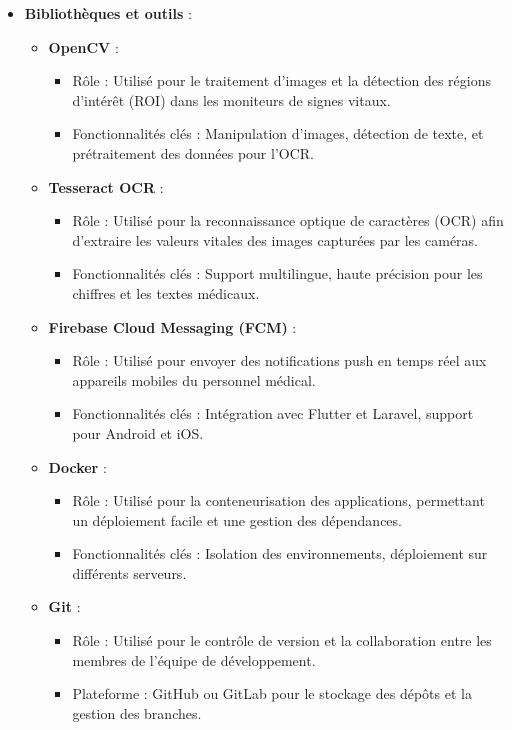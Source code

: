\begin{itemize}
    \item \textbf{Bibliothèques et outils} :
    \begin{itemize}
        \item \textbf{OpenCV} :
            \begin{itemize}
                \item Rôle : Utilisé pour le traitement d'images et la détection des régions d'intérêt (ROI) dans les moniteurs de signes vitaux.
                \item Fonctionnalités clés : Manipulation d'images, détection de texte, et prétraitement des données pour l'OCR.
            \end{itemize}
        \item \textbf{Tesseract OCR} :
            \begin{itemize}
                \item Rôle : Utilisé pour la reconnaissance optique de caractères (OCR) afin d'extraire les valeurs vitales des images capturées par les caméras.
                \item Fonctionnalités clés : Support multilingue, haute précision pour les chiffres et les textes médicaux.
            \end{itemize}
        \item \textbf{Firebase Cloud Messaging (FCM)} :
            \begin{itemize}
                \item Rôle : Utilisé pour envoyer des notifications push en temps réel aux appareils mobiles du personnel médical.
                \item Fonctionnalités clés : Intégration avec Flutter et Laravel, support pour Android et iOS.
            \end{itemize}
        \item \textbf{Docker} :
            \begin{itemize}
                \item Rôle : Utilisé pour la conteneurisation des applications, permettant un déploiement facile et une gestion des dépendances.
                \item Fonctionnalités clés : Isolation des environnements, déploiement sur différents serveurs.
            \end{itemize}
        \item \textbf{Git} :
            \begin{itemize}
                \item Rôle : Utilisé pour le contrôle de version et la collaboration entre les membres de l'équipe de développement.
                \item Plateforme : GitHub ou GitLab pour le stockage des dépôts et la gestion des branches.
            \end{itemize}
    \end{itemize}
\end{itemize}